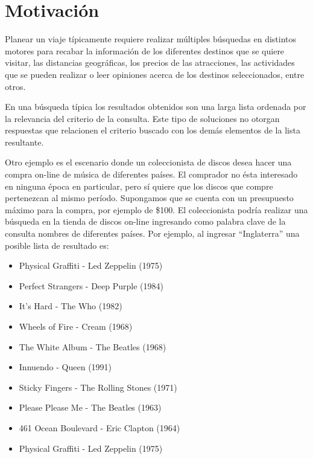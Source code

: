\section{Motivación}
Planear un viaje típicamente requiere realizar múltiples búsquedas en distintos motores para recabar la información de los diferentes destinos que se quiere visitar, las distancias geográficas, los precios de las atracciones, las actividades que se pueden realizar o leer opiniones acerca de los destinos seleccionados, entre otros.

En una búsqueda típica los resultados obtenidos son una larga lista ordenada por la relevancia del criterio de la consulta. Este tipo de soluciones no otorgan respuestas que relacionen el criterio buscado con los demás elementos de la lista resultante.

Otro ejemplo es el escenario donde un coleccionista de discos desea hacer una compra on-line de música de diferentes países. El comprador no ésta interesado en ninguna época en particular, pero sí quiere que los discos que compre pertenezcan al mismo período. Supongamos que se cuenta con un presupuesto máximo para la compra, por ejemplo de \$100. El coleccionista podría realizar una búsqueda en la tienda de discos on-line ingresando como palabra clave de la consulta nombres de diferentes países. Por ejemplo, al ingresar ``Inglaterra'' una posible lista de resultado es:
\begin{itemize}
  \item Physical Graffiti - Led Zeppelin (1975)
  \item Perfect Strangers - Deep Purple (1984)
  \item It's Hard - The Who  (1982)
  \item Wheels of Fire - Cream (1968)
  \item The White Album - The Beatles (1968)
  \item Innuendo - Queen (1991)
  \item Sticky Fingers - The Rolling Stones (1971)
	\item Please Please Me - The Beatles (1963)
	\item 461 Ocean Boulevard - Eric Clapton (1964)
	\item Physical Graffiti - Led Zeppelin (1975)
\end{itemize}

